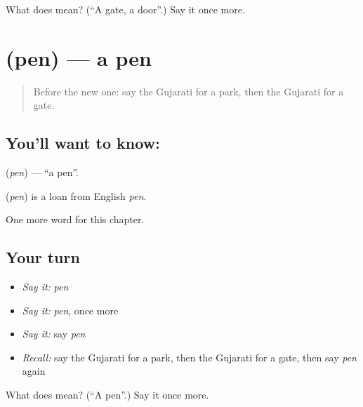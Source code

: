 \begin{tcolorbox}[breakable,colback=teal!4,colframe=teal!35!black,title={Before you move on}]
What does  mean? (\textquotedblleft{}A gate, a door\textquotedblright{}.) Say it once more.
\end{tcolorbox}
\section[\texorpdfstring{\gu{પેન} (pen)}{પેન (pen)}]{ (pen) — a pen}

\label{lesson:GU-C129-pen}



\begin{quote}
Before the new one: say the Gujarati for a park, then the Gujarati for a gate.
\end{quote}

\subsection*{You'll want to know: }
\textbf{} (\emph{pen}) — \textquotedblleft{}a pen\textquotedblright{}.

\begin{cousinweb}
\textbf{} (\emph{pen}) is a loan from English \emph{pen}.
\end{cousinweb}

\begin{grammarlens}[title={What you've built}]
One more word for this chapter.
\end{grammarlens}

\subsection*{Your turn}
\begin{itemize}
\raggedright
  \item \emph{Say it:} \emph{pen}
  \item \emph{Say it:} \emph{pen}, once more
  \item \emph{Say it:} say \emph{pen}
  \item \emph{Recall:} say the Gujarati for a park, then the Gujarati for a gate, then say \emph{pen} again
\end{itemize}

\begin{tcolorbox}[breakable,colback=teal!4,colframe=teal!35!black,title={Before you move on}]
What does  mean? (\textquotedblleft{}A pen\textquotedblright{}.) Say it once more.
\end{tcolorbox}
